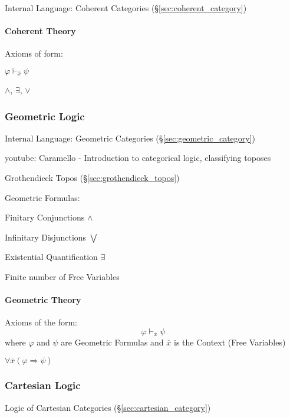 Internal Language: Coherent Categories (\S\ref{sec:coherent_category})



\paragraph{Coherent Theory}\label{sec:coherent_theory}\hfill

Axioms of form:

$\varphi \vdash_{\overline{x}} \psi$

$\wedge$, $\exists$, $\vee$



\subsubsection{Geometric Logic}\label{sec:geometric_logic}

Internal Language: Geometric Categories
(\S\ref{sec:geometric_category})


youtube: Caramello - Introduction to categorical logic, classifying
toposes

Grothendieck Topos (\S\ref{sec:grothendieck_topos})

Geometric Formulas:

Finitary Conjunctions $\wedge$

Infinitary Disjunctions $\bigvee$

Existential Quantification $\exists$

Finite number of Free Variables



\paragraph{Geometric Theory}\label{sec:geometric_theory}\hfill

Axioms of the form:
\[
  \varphi \vdash_{\overline{x}} \psi
\]
where $\varphi$ and $\psi$ are Geometric Formulas and $\overline{x}$
is the Context (Free Variables) %

$\forall \overline{x} (\varphi \Rightarrow \psi)$



\subsubsection{Cartesian Logic}\label{sec:cartesian_logic}

Logic of Cartesian Categories (\S\ref{sec:cartesian_category})

